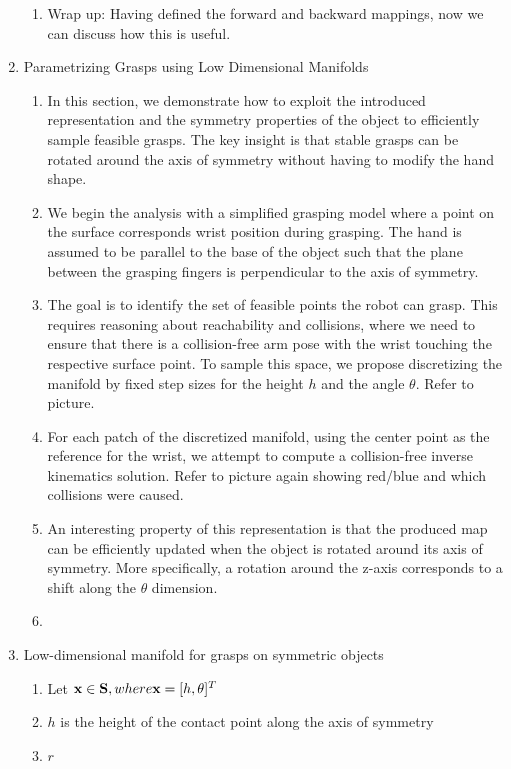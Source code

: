 \documentclass{aamas2015}
\begin{document}
\begin{enumerate}
\begin{enumerate}
		\item Wrap up: Having defined the forward and backward mappings, now we can discuss how this is useful.
	\end{enumerate}
	
	\item Parametrizing Grasps using Low Dimensional Manifolds
	\begin{enumerate}
		
		\item In this section, we demonstrate how to exploit the introduced representation and the symmetry properties of the object to efficiently sample feasible grasps. The key insight is that stable grasps can be rotated around the axis of symmetry without having to modify the hand shape. 
			
		\item We begin the analysis with a simplified grasping model where a point
		on the surface corresponds wrist position during grasping. The hand is assumed to be parallel to the base of the object such that the plane between the grasping fingers is perpendicular to the axis of symmetry. 

		\item The goal is to identify the set of feasible points the robot can grasp. This requires reasoning about reachability and collisions, where we need to ensure that there is a collision-free arm pose with the wrist touching the respective surface point. To sample this space, we propose discretizing the manifold by fixed step sizes for the height $h$ and the angle $\theta$. Refer to picture.
		
		\item For each patch of the discretized manifold, using the center point 
		as the reference for the wrist, we attempt to compute a collision-free 		inverse kinematics solution. Refer to picture again showing red/blue and which collisions were caused. 
		
		\item An interesting property of this representation is that the produced map can be efficiently updated when the object is rotated around its axis of symmetry. More specifically, a rotation around the z-axis corresponds to a shift along the $\theta$ dimension. 
		
		\item 
	\end{enumerate}
	
	\item Low-dimensional manifold for grasps on symmetric objects	
	\begin{enumerate}
	\item Let $\textbf{x} \in \textbf{S}, where \textbf{x} = [h, \theta]^T$
	\item $h$ is the height of the contact point along the axis of symmetry
	\item $r$
	\end{enumerate}

\end{enumerate}
\end{document}
